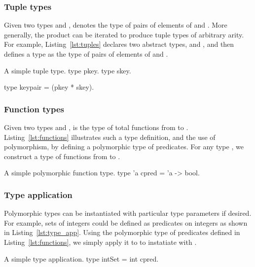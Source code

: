 \subsubsection*{Tuple types}
Given two types  and ,  denotes the type of pairs
of elements of  and . More generally, the product can be iterated
to produce tuple types of arbitrary arity. For example, Listing~\ref{lst:tuples}
declares two abstract types,  and , and then defines a type
 as the type of pairs of elements of  and .


\begin{easycrypt}[label={lst:tuples}]{A simple tuple type.}
type pkey.
type skey.

type keypair = (pkey * skey).
\end{easycrypt}

\subsubsection*{Function types}
Given two types  and ,  is the type of total
functions from  to . Listing~\ref{lst:functions} illustrates such
a type definition, and the use of polymorphism, by defining a polymorphic type
of predicates. For any type , we construct a type  of
functions from  to .

\begin{easycrypt}[label={lst:functions}]{A simple polymorphic function type.}
type 'a cpred = 'a -> bool.
\end{easycrypt}

\subsubsection*{Type application}
Polymorphic types can be instantiated with particular type parameters if
desired. For example, sets of integers could be defined as predicates on
integers as shown in Listing~\ref{lst:type_app}. Using the polymorphic type of
predicates defined in Listing~\ref{lst:functions}, we simply apply it to
 to instatiate  with .

\begin{easycrypt}[label={lst:type_app}]{A simple type application.}
type intSet = int cpred.
\end{easycrypt}

